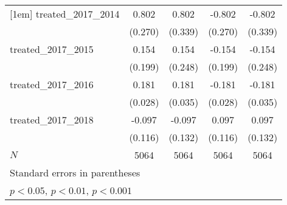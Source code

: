{\begin{tabular}{l*{4}{c}}
[1em]
treated\_2017\_2014&       0.802\sym{**} &       0.802\sym{*}  &      -0.802\sym{**} &      -0.802\sym{*}  \\
            &     (0.270)         &     (0.339)         &     (0.270)         &     (0.339)         \\
[1em]
treated\_2017\_2015&       0.154         &       0.154         &      -0.154         &      -0.154         \\
            &     (0.199)         &     (0.248)         &     (0.199)         &     (0.248)         \\
[1em]
treated\_2017\_2016&       0.181\sym{***}&       0.181\sym{***}&      -0.181\sym{***}&      -0.181\sym{***}\\
            &     (0.028)         &     (0.035)         &     (0.028)         &     (0.035)         \\
[1em]
treated\_2017\_2018&      -0.097         &      -0.097         &       0.097         &       0.097         \\
            &     (0.116)         &     (0.132)         &     (0.116)         &     (0.132)         \\
\hline
\(N\)       &        5064         &        5064         &        5064         &        5064         \\
\hline\hline
\multicolumn{5}{l}{\footnotesize Standard errors in parentheses}\\
\multicolumn{5}{l}{\footnotesize \sym{*} \(p<0.05\), \sym{**} \(p<0.01\), \sym{***} \(p<0.001\)}\\
\end{tabular}
}
